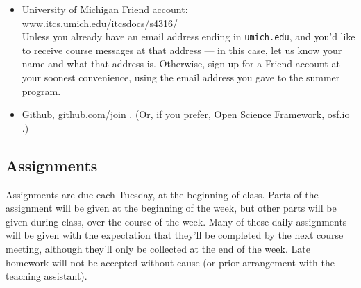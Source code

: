 \documentclass[12pt]{article}
\begin{document}
 \begin{itemize}
 \item University of Michigan Friend account:\\
\url{www.itcs.umich.edu/itcsdocs/s4316/}\\
Unless you already have an email address ending in
\texttt{umich.edu}, and you'd like to receive course messages at that
address --- in this case, let us know your name and what that address
is.  Otherwise, sign up for a Friend account at your soonest convenience, using the email address
you gave to the summer program. 
\item Github, \url{github.com/join} . (Or, if you prefer, Open Science
  Framework, \url{osf.io} .)
 \end{itemize}


\subsection{Assignments}
Assignments are due each Tuesday, at the beginning of
class. Parts of the assignment will be given at the beginning of the
week, but other parts will be given during class, over the course of
the week.  Many of these daily assignments will be given with the
expectation that they'll be completed by the next course meeting,
although they'll only be collected at the end of the week.
Late homework will not be accepted without cause (or prior arrangement
with the teaching assistant).   
\end{document}
